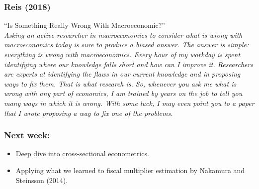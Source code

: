 \documentclass[english,xcolor=svgnames]{beamer}
\begin{document}
\begin{frame}
\frametitle[alignment=center]{Reis (2018)}
``Is Something Really Wrong With Macroeconomic?''\\
$\;$\\
\emph{Asking an active researcher in macroeconomics to consider what is wrong with macroeconomics today is sure to produce a biased answer. The answer is simple: everything is wrong with macroeconomics. Every hour of my workday is spent identifying where our knowledge falls short and how can I improve it. Researchers are experts at identifying the flaws in our current knowledge and in proposing ways to fix them. That is what research is. So, whenever you ask me what is wrong with any part of economics, I am trained by years on the job to tell you many ways in which it is wrong. With some luck, I may even point you to a paper that I wrote proposing a way to fix one of the problems.}
\end{frame}





\begin{frame}
\frametitle[alignment=center]{Next week:}
\begin{itemize}
	\item Deep dive into cross-sectional econometrics.
	\item Applying what we learned to fiscal multiplier estimation by Nakamura and Steinsson (2014).
\end{itemize}
\end{frame}
\end{document}
